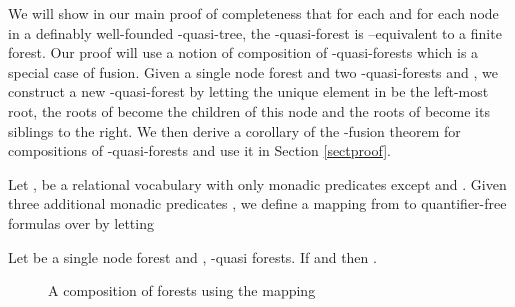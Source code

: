 \documentclass{LMCS}
\begin{document}
We will show in our main proof of completeness that for each  and for each node  in a
definably well-founded -quasi-tree, the -quasi-forest  is --equivalent to a finite forest.
Our proof will use a notion of composition of -quasi-forests which is a special case of fusion.
Given a single node forest  and two -quasi-forests  and
, we construct a new -quasi-forest  by letting
the unique element in  be the left-most root, the roots of  become the children of this node and the roots of  become its siblings to the right. We then derive a corollary of the -fusion theorem for compositions of -quasi-forests and use it in Section \ref{sectproof}.

\begin{defi}
Let , be a relational vocabulary with only monadic predicates except  and . Given three
additional monadic predicates , we define a mapping  from  to quantifier-free formulas over  by letting
\begin{iteMize}{}
\item   
 \item  
 \item  
\item   
\end{iteMize}
\end{defi}
\begin{cor}
Let  be a single node forest and ,  -quasi forests. If  and  then
.
\end{cor}



\begin{figure}[!h]
\begin{center}
\caption{A composition of forests using the mapping }\label{compforest} \label{jolidessin}
  \end{center}
\end{figure}
\end{document}
